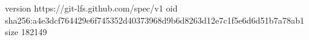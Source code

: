 version https://git-lfs.github.com/spec/v1
oid sha256:a4e3dcf764429e6f745352d40373968d9b6d8263d12e7c1f5e6d6d51b7a78ab1
size 182149
